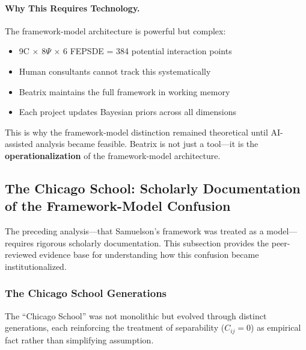 \paragraph{Why This Requires Technology.}

The framework-model architecture is powerful but complex:
\begin{itemize}[nosep]
    \item 9C $\times$ 8$\Psi$ $\times$ 6 FEPSDE = 384 potential interaction points
    \item Human consultants cannot track this systematically
    \item Beatrix maintains the full framework in working memory
    \item Each project updates Bayesian priors across all dimensions
\end{itemize}

This is why the framework-model distinction remained theoretical until AI-assisted
analysis became feasible. Beatrix is not just a tool---it is the \textbf{operationalization}
of the framework-model architecture.



\subsection{The Chicago School: Scholarly Documentation of the Framework-Model Confusion}
\label{sec:meta-chicago}

The preceding analysis---that Samuelson's framework was treated as a model---requires
rigorous scholarly documentation. This subsection provides the peer-reviewed evidence
base for understanding how this confusion became institutionalized.

\subsubsection{The Chicago School Generations}

The ``Chicago School'' was not monolithic but evolved through distinct generations,
each reinforcing the treatment of separability ($C_{ij} = 0$) as empirical fact
rather than simplifying assumption.

